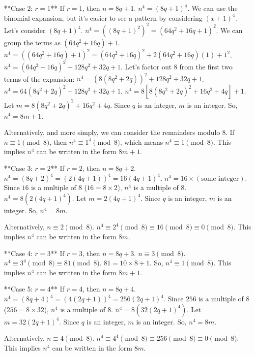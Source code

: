 \documentclass{article}
\begin{document}
\add [10pt]

**Case 2: $r = 1$**
If $r = 1$, then $n = 8q + 1$.
$n^4 = (8q + 1)^4$. We can use the binomial expansion, but it's easier to see a pattern by considering $(x+1)^4$.
Let's consider $(8q+1)^4$.
$n^4 = ((8q+1)^2)^2 = (64q^2 + 16q + 1)^2$.
We can group the terms as $(64q^2 + 16q) + 1$.
$n^4 = ((64q^2 + 16q) + 1)^2 = (64q^2 + 16q)^2 + 2(64q^2 + 16q)(1) + 1^2$.
$n^4 = (64q^2 + 16q)^2 + 128q^2 + 32q + 1$.
Let's factor out 8 from the first two terms of the expansion:
$n^4 = (8(8q^2 + 2q))^2 + 128q^2 + 32q + 1$.
$n^4 = 64(8q^2 + 2q)^2 + 128q^2 + 32q + 1$.
$n^4 = 8[8(8q^2 + 2q)^2 + 16q^2 + 4q] + 1$.
Let $m = 8(8q^2 + 2q)^2 + 16q^2 + 4q$. Since $q$ is an integer, $m$ is an integer.
So, $n^4 = 8m + 1$.

Alternatively, and more simply, we can consider the remainders modulo 8.
If $n \equiv 1 \pmod{8}$, then $n^4 \equiv 1^4 \pmod{8}$, which means $n^4 \equiv 1 \pmod{8}$. This implies $n^4$ can be written in the form $8m + 1$.

\add [10pt]

**Case 3: $r = 2$**
If $r = 2$, then $n = 8q + 2$.
$n^4 = (8q + 2)^4 = (2(4q + 1))^4 = 16(4q + 1)^4$.
$n^4 = 16 \times (\text{some integer})$.
Since $16$ is a multiple of $8$ ($16 = 8 \times 2$), $n^4$ is a multiple of $8$.
$n^4 = 8(2(4q + 1)^4)$. Let $m = 2(4q + 1)^4$. Since $q$ is an integer, $m$ is an integer.
So, $n^4 = 8m$.

Alternatively, $n \equiv 2 \pmod{8}$.
$n^4 \equiv 2^4 \pmod{8} \equiv 16 \pmod{8} \equiv 0 \pmod{8}$.
This implies $n^4$ can be written in the form $8m$.

\add [10pt]

**Case 4: $r = 3$**
If $r = 3$, then $n = 8q + 3$.
$n \equiv 3 \pmod{8}$.
$n^4 \equiv 3^4 \pmod{8} \equiv 81 \pmod{8}$.
$81 = 10 \times 8 + 1$.
So, $n^4 \equiv 1 \pmod{8}$.
This implies $n^4$ can be written in the form $8m + 1$.

\add [10pt]

**Case 5: $r = 4$**
If $r = 4$, then $n = 8q + 4$.
$n^4 = (8q + 4)^4 = (4(2q + 1))^4 = 256(2q + 1)^4$.
Since $256$ is a multiple of $8$ ($256 = 8 \times 32$), $n^4$ is a multiple of $8$.
$n^4 = 8(32(2q + 1)^4)$. Let $m = 32(2q + 1)^4$. Since $q$ is an integer, $m$ is an integer.
So, $n^4 = 8m$.

Alternatively, $n \equiv 4 \pmod{8}$.
$n^4 \equiv 4^4 \pmod{8} \equiv 256 \pmod{8} \equiv 0 \pmod{8}$.
This implies $n^4$ can be written in the form $8m$.

\add [10pt]
\end{document}
